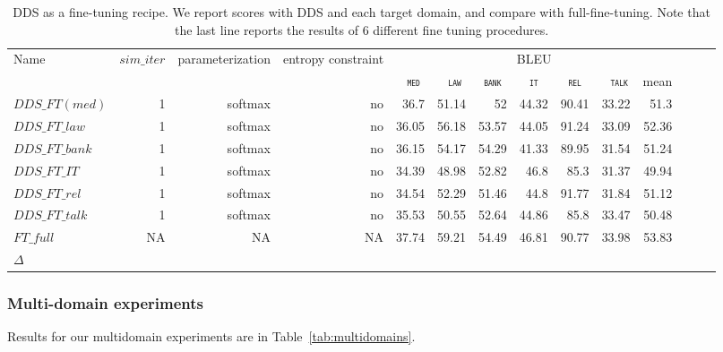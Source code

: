 \documentclass[11pt,a4paper]{article}
\newcommand{\fyTodo}[1]{\Todo[FY:]{\textcolor{orange}{#1}}}
\newcommand{\domain}[1]{\texttt{\textsc{#1}}}
\newcommand{\system}[1]{\texttt{{#1}}}
\begin{document}
\begin{table}[htb]
  \centering%
  \begin{adjustbox}{width=1.0\textwidth,center}
  \begin{tabular}{|p{3.0cm}|*{13}{r|}} \hline
    \multirow{2}{*}{Name} & \multirow{2}{*}{$sim\_iter$} & \multirow{2}{*}{parameterization} & \multirow{2}{*}{entropy constraint} & \multicolumn{7}{|c|}{BLEU} \\ \cline{5-11}	
   & & & & \multicolumn{1}{c|}{\domain{ med}} & \multicolumn{1}{c|}{\domain{ law}} & \multicolumn{1}{c|}{\domain{bank}} & \multicolumn{1}{c|}{\domain{it}} & \multicolumn{1}{c|}{\domain{ rel }} & \multicolumn{1}{c|}{\domain{ talk}} & \multicolumn{1}{c|}{mean} \\
    \hline
  \system{$DDS\_FT (med)$} & 1 & softmax & no & 36.7&51.14&52&44.32&90.41&33.22&51.3\\
  \system{$DDS\_FT\_law$} & 1 & softmax & no &36.05&56.18&53.57&44.05&91.24&33.09&52.36\\
  \system{$DDS\_FT\_bank$} & 1 & softmax & no &36.15&54.17&54.29&41.33&89.95&31.54&51.24 \\
  \system{$DDS\_FT\_IT$} & 1 & softmax & no &34.39&48.98&52.82&46.8&85.3&31.37&49.94 \\
  \system{$DDS\_FT\_rel$} & 1 & softmax & no & 34.54&52.29&51.46&44.8&91.77&31.84&51.12\\
  \system{$DDS\_FT\_talk$} & 1 & softmax & no & 35.53&50.55&52.64&44.86&85.8&33.47&50.48\\
  \system{$FT\_full$} & NA & NA & NA & 37.74&59.21	&54.49&46.81&90.77&33.98&53.83\\
    \hline
    $\Delta$ & \\
  \end{tabular}
  \end{adjustbox}
  \caption{DDS as a fine-tuning recipe. We report scores with DDS and each target domain, and compare with full-fine-tuning. Note that the last line reports the results of 6 different fine tuning procedures.}
  \label{tab:finetuning-old}
\end{table}\fyTodo{This table does not work- One line would be enough, where we compare autoFT with true FT}

\fyTodo{Works best for small domains ?}
\fyTodo{Curves for bank / medical ou law}
\fyTodo{Fine tune pour 2 domains ?}


\subsubsection{Multi-domain experiments}
Results for our multidomain experiments are in Table~\ref{tab:multidomains}.\fyTodo{Same table, line autoMD. We should be clear about the dev / test distribution - uniform ? so I would compare MIX with DDS(UNIF, UNIF) - DDS(NAT,UNIF) and not report / domain scores}
\end{document}
